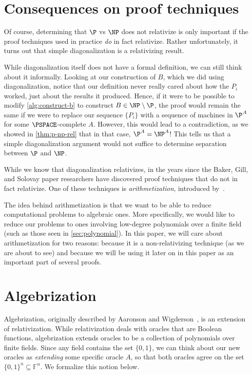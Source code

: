 \documentclass[english,12pt]{reedthesis}
\theoremstyle{plain}
\theoremstyle{definition}
\theoremstyle{remark}
\begin{document}
\section{Consequences on proof techniques}\label{sec:rel-conseq}

Of course, determining that $\P$ vs $\NP$ does not relativize is only important
if the proof techniques used in practice \emph{do} in fact relativize. Rather
unfortunately, it turns out that simple diagonalization is a relativizing
result.

While diagonalization itself does not have a formal definition, we can still
think about it informally. Looking at our construction of $B$, which we did
using diagonalization, notice that our definition never really cared about how
the $P_{i}$ worked, just about the results it produced. Hence, if it were to be
possible to modify \cref{alg:construct-b} to construct $B \in \NP \setminus \P$, the proof
would remain the same if we were to replace our sequence $\{P_{i}\}$ with a
sequence of machines in $\P^{A}$ for some $\PSPACE$-complete $A$. However, this
would lead to a contradiction, as we showed in \cref{thm:p-np-rel} that in that
case, $\P^{A} = \NP^{A}$! This tells us that a simple diagonalization argument
would not suffice to determine separation between $\P$ and $\NP$.

While we know that diagonalization relativizes, in the years since the Baker,
Gill, and Solovay paper researchers have discovered proof techniques that do not
in fact relativize. One of these techniques is
\emph{arithmetization}, introduced by~\cite{BF91}.

The idea behind arithmetization is that we want to be able to reduce
computational problems to algebraic ones. More specifically, we would like to
reduce our problems to ones involving low-degree polynomials over a finite field
(such as those seen in \cref{sec:polynomial}). In this paper, we will care about
arithmetization for two reasons: because it is a non-relativizing technique (as
we are about to see) and because we will be using it later on in this paper as
an important part of several proofs.

\section{Algebrization}\label{chap:algebrization}

Algebrization, originally described by Aaronson and Wigderson~\cite{AW09}, is an
extension of relativization. While relativization deals with oracles that are
Boolean functions, algebrization extends oracles to be a collection of
polynomials over finite fields. Since any field contains the set $\{0, 1\}$, we
can think about our new oracles as \emph{extending} some specific oracle $A$, so
that both oracles agree on the set $\{0, 1\}^{n} \subseteq \mathbb{F}^{n}$. We formalize
this notion below.
\end{document}
